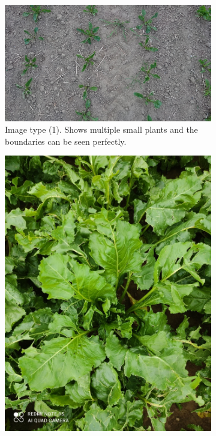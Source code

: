 \begin{figure}[htb!]
	\begin{subfigure}{.6\textwidth}
		\centering
		\includegraphics[scale=0.18]{figures/image_type1.JPG}
		\caption{Image type (1). Shows multiple small plants and the boundaries can be seen perfectly.}
		\label{fig:type_1}
	\end{subfigure}%
	\begin{subfigure}{.4\textwidth}
		\centering
		\includegraphics[scale=0.17]{figures/image_type2.jpg}

\end{subfigure}
\end{figure}
